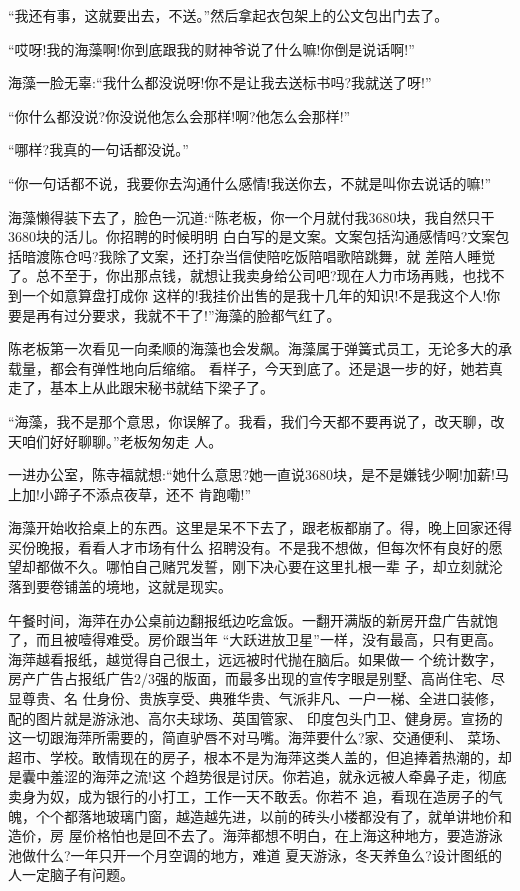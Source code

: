 \documentclass[11pt,a4paper,onecolumn]{article}
\begin{document}
``我还有事，这就要出去，不送。''然后拿起衣包架上的公文包出门去了。

``哎呀!我的海藻啊!你到底跟我的财神爷说了什么嘛!你倒是说话啊!''

海藻一脸无辜:``我什么都没说呀!你不是让我去送标书吗?我就送了呀!''

``你什么都没说?你没说他怎么会那样!啊?他怎么会那样!''

``哪样?我真的一句话都没说。''

``你一句话都不说，我要你去沟通什么感情!我送你去，不就是叫你去说话的嘛!''

海藻懒得装下去了，脸色一沉道:``陈老板，你一个月就付我3680块，我自然只干3680块的活儿。你招聘的时候明明
白白写的是文案。文案包括沟通感情吗?文案包括暗渡陈仓吗?我除了文案，还打杂当信使陪吃饭陪唱歌陪跳舞，就
差陪人睡觉了。总不至于，你出那点钱，就想让我卖身给公司吧?现在人力市场再贱，也找不到一个如意算盘打成你
这样的!我挂价出售的是我十几年的知识!不是我这个人!你要是再有过分要求，我就不干了!''海藻的脸都气红了。

陈老板第一次看见一向柔顺的海藻也会发飙。海藻属于弹簧式员工，无论多大的承载量，都会有弹性地向后缩缩。
看样子，今天到底了。还是退一步的好，她若真走了，基本上从此跟宋秘书就结下梁子了。

``海藻，我不是那个意思，你误解了。我看，我们今天都不要再说了，改天聊，改天咱们好好聊聊。''老板匆匆走
人。

一进办公室，陈寺福就想:``她什么意思?她一直说3680块，是不是嫌钱少啊!加薪!马上加!小蹄子不添点夜草，还不
肯跑嘞!''

海藻开始收拾桌上的东西。这里是呆不下去了，跟老板都崩了。得，晚上回家还得买份晚报，看看人才市场有什么
招聘没有。不是我不想做，但每次怀有良好的愿望却都做不久。哪怕自己赌咒发誓，刚下决心要在这里扎根一辈
子，却立刻就沦落到要卷铺盖的境地，这就是现实。

午餐时间，海萍在办公桌前边翻报纸边吃盒饭。一翻开满版的新房开盘广告就饱了，而且被噎得难受。房价跟当年
``大跃进放卫星''一样，没有最高，只有更高。海萍越看报纸，越觉得自己很土，远远被时代抛在脑后。如果做一
个统计数字，房产广告占报纸广告2/3强的版面，而最多出现的宣传字眼是\myrule 别墅、高尚住宅、尽显尊贵、名
仕身份、贵族享受、典雅华贵、气派非凡、一户一梯、全进口装修，配的图片就是游泳池、高尔夫球场、英国管家、
印度包头门卫、健身房。宣扬的这一切跟海萍所需要的，简直驴唇不对马嘴。海萍要什么?\myrule 家、交通便利、
菜场、超市、学校。敢情现在的房子，根本不是为海萍这类人盖的，但追捧着热潮的，却是囊中羞涩的海萍之流!这
个趋势很是讨厌。你若追，就永远被人牵鼻子走，彻底卖身为奴，成为银行的小打工，工作一天不敢丢。你若不
追，看现在造房子的气魄，个个都落地玻璃门窗，越造越先进，以前的砖头小楼都没有了，就单讲地价和造价，房
屋价格怕也是回不去了。海萍都想不明白，在上海这种地方，要造游泳池做什么?一年只开一个月空调的地方，难道
夏天游泳，冬天养鱼么?设计图纸的人一定脑子有问题。
\end{document}
